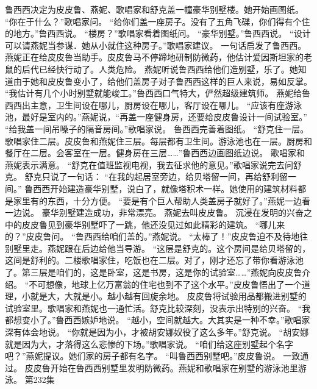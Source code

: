 \documentclass[a4paper,12pt,UTF8,twoside]{ctexbook}
\begin{document}
        鲁西西决定为皮皮鲁、燕妮、歌唱家和舒克盖一幢豪华别墅楼。她开始画图纸。  
        “你在于什么？”歌唱家问。  
        “给你们盖一座房子。没有了五角飞碟，你们得有个住的地方。”鲁西西说。  
        “楼房？”歌唱家看着图纸问。  
        “豪华别墅。”鲁西西说。  
        “设计可以请燕妮当参谋．她从小就住这种房子。”歌唱家建议。  
        一句话启发了鲁西西。  
        燕妮正在给皮皮鲁当助手。皮皮鲁马不停蹄地研制防微药，他估计爱因斯坦家的老鼠的后代已经快行动了。人类危险。  
        燕妮听说鲁西西给他们造别墅，乐了。她知道由于她和皮皮鲁变小了，给他们盖房子对子鲁西西这样的巨人来说，易如反掌。  
        “我估计有几个小时别墅就能竣工。”鲁西西口气特大，俨然超级建筑师。  
        燕妮给鲁西西出主意，卫生间设在哪儿，厨房设在哪儿，客厅设在哪儿。  
        “应该有座游泳池，最好是室内的。”燕妮说，“再盖一座健身房，还要给皮皮鲁设计一间试验室。”  
        “给我盖一间吊嗓子的隔音房间。”歌唱家说。        
        鲁西西完善着图纸。  
        “舒克住一层。歌唱家住二层。皮皮鲁和燕妮住三层。每层都有卫生间。游泳池也在一层。厨房和餐厅在二层。会客室在一层。健身房在三层……”鲁西西边画图纸边说。  
        歌唱家和燕妮表示满意。  
        “舒克在值班监视电视，我去征求他的意见。”歌唱家说完去问舒克。  
        舒克只说了一句话：  
        “在我的起居室旁边，给贝塔留一间，再给舒利留一间。”  
        鲁西西开始建造豪华别墅，说白了，就像塔积术一样。她使用的建筑材料都是家里有的东西，十分方便。  
        “要是有个巨人帮助人类盖房子就好了。”燕妮一边看一边说。  
        豪华别墅建造成功，非常漂亮。  
        燕妮去叫皮皮鲁。  
        沉浸在发明的兴奋之中的皮皮鲁见到豪华别墅吓了一跳，他还没见过如此精彩的建筑。  
        “哪儿来的？”皮皮鲁问。  
        “鲁西西给咱们盖的。”燕妮说。  
        “太棒了！”皮皮鲁迫不及待地往别墅里走。燕妮跟在后边给他当导游。        
        “这层是舒克的。这个房间是给贝塔留的，这间是舒利的。二楼歌唱家住，吃饭也在二层。对了，刚才还忘了带你看游泳池了。第三层是咱们的，这是卧室，这是书房，这是你的试验室……”燕妮向皮皮鲁介绍。  
        “不可想像，地球上亿万富翁的住宅也到不了这个水平。”皮皮鲁悟出了一个道理，小就是大，大就是小。越小越有回旋余地。  
        皮皮鲁将试验用品都搬进别墅的试验室里。歌唱家和燕妮也一通忙活。舒克比较深刻，没表示出特别的兴奋。  
        “我都想变小了。”鲁西西嫉妒地说。  
        “越小，空间就越大。大其实是一种不幸。”歌唱家深有体会地说。  
        “你就是因为小，才被胡安娜奴役了这么多年。”舒克说。  
        “胡安娜就是因为大，才落得这么悲惨的下场。”歌唱家说。  
        “咱们给这座别墅起个名字吧？”燕妮提议。她们家的房子都有名字。  
        “叫鲁西西别墅吧。”皮皮鲁说。  
        一致通过。  
        皮皮鲁开始在鲁西西别墅里发明防微药。燕妮和歌唱家在别墅的游泳池里游泳。          第232集  
\end{document}
